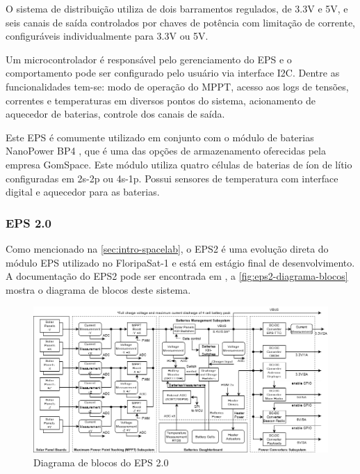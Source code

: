 O sistema de distribuição utiliza de dois barramentos regulados, de 3.3V e 5V, e seis canais de saída controlados por chaves de potência com limitação de corrente, configuráveis individualmente para 3.3V ou 5V.

Um microcontrolador é responsável pelo gerenciamento do \gls{EPS} e o comportamento pode ser configurado pelo usuário via interface \gls{I2C}.
Dentre as funcionalidades tem-se: modo de operação do \gls{MPPT}, acesso aos logs de tensões, correntes e temperaturas em diversos pontos do sistema, acionamento de aquecedor de baterias, controle dos canais de saída.

Este EPS é comumente utilizado em conjunto com o módulo de baterias NanoPower BP4 \cite{bp4-datasheet}, que é uma das opções de armazenamento oferecidas pela empresa GomSpace.
Este módulo utiliza quatro células de baterias de íon de lítio configuradas em 2s-2p ou 4s-1p. Possui sensores de temperatura com interface digital e aquecedor para as baterias.



\subsubsection{EPS 2.0}

Como mencionado na \autoref{sec:intro-spacelab}, o \gls{EPS2} é uma evolução direta do módulo \gls{EPS} utilizado no FloripaSat-1 \cite{floripasat-1} e está em estágio final de desenvolvimento. A documentação do \gls{EPS2} pode ser encontrada em \cite{eps2-doc}, a \autoref{fig:eps2-diagrama-blocos} mostra o diagrama de blocos deste sistema.

\begin{figure}[htp]
    \caption{Diagrama de blocos do EPS 2.0}
    \begin{center}
        \includegraphics[width=\textwidth, keepaspectratio]{images/eps2-power-diagram.png}
    \end{center}
    \label{fig:eps2-diagrama-blocos}
\end{figure}


